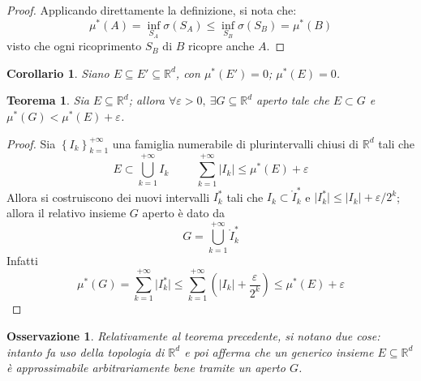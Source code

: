 \documentclass[11pt]{article}
\theoremstyle{style}
\newtheorem{teorema}{Teorema}[section]
\newtheorem{corollario}{Corollario}[teorema]
\newtheorem{osservazione}{Osservazione}[section]
\numberwithin{equation}{subsection}
\begin{document}
	\begin{proof}
		Applicando direttamente la definizione, si nota che:
		\[
		\mu^* (A) = \inf_{S_A} \sigma (S_A) \le \inf_{S_B} \sigma (S_B) = \mu^* (B)  
		\] 
		visto che ogni ricoprimento $S_B$ di $B$ ricopre anche $A$.
	\end{proof}
\begin{corollario}
	Siano $E \subseteq E' \subseteq \mathbb{R}^d$, con $\mu^* (E') = 0$; $\mu^* (E) = 0$.
\end{corollario}
\begin{teorema}\label{thfond}
	Sia $E \subseteq \mathbb{R}^d$; allora $\forall \varepsilon >0, \ \exists G \subseteq \mathbb{R}^d$ aperto tale che $E \subset G$ e $\mu^* (G) < \mu^* (E) + \varepsilon $.
\end{teorema}
\begin{proof}
	Sia $\left\{ I_k \right\} _{k=1} ^{+\infty} $ una famiglia numerabile di plurintervalli chiusi di $\mathbb{R}^d$ tali che
	\[
	E \subset \bigcup _{k=1} ^{+\infty}I_k \hspace{1cm} \sum_{k=1}^{+\infty}\lvert I_k \rvert  \le \mu^* (E) + \varepsilon  
	\] 
	Allora si costruiscono dei nuovi intervalli $I_k^*$ tali che $I_k \subset \mathring{I}_k^*$ e $\lvert I_k^* \rvert \le \lvert I_k \rvert + \varepsilon / 2^{k} $; allora il relativo insieme $G$ aperto \`e dato da
	\[
		G = \bigcup_{k=1} ^{+\infty} \mathring{I}_k^*
	\] 
	Infatti
	\[
	\mu^* (G) = \sum_{k=1}^{+\infty} \lvert I_k^* \rvert \le  \sum_{k=1}^{+\infty}\left( \lvert I_k \rvert + \frac{\varepsilon }{2^{k} }\right) \le \mu^* (E)+\varepsilon 
	\] 
	
\end{proof}
\begin{osservazione}
Relativamente al teorema precedente, si notano due cose: intanto fa uso della topologia di $\mathbb{R}^d$ e poi afferma che un generico insieme $E \subseteq \mathbb{R}^d$ \`e approssimabile arbitrariamente bene tramite un aperto $G$.
\end{osservazione}
\end{document}

